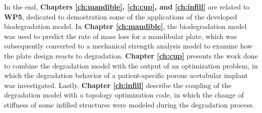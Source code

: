 In the end, \textbf{Chapters \ref{ch:mandible}, \ref{ch:cup}, and \ref{ch:infill}} are related to \textbf{WP5}, dedicated to demostration some of the applications of the developed biodegradation model. In \textbf{Chapter \ref{ch:mandible}}, the biodegradation model was used to predict the rate of mass loss for a mandibular plate, which was subsequently converted to a mechanical strength analysis model to examine how the plate design reacts to degradation. \textbf{Chapter \ref{ch:cup}} presents the work done to combine the degradation model with the output of an optimization problem, in which the degradation behavior of a patient-specific porous acetabular implant was investigated. Lastly, \textbf{Chapter \ref{ch:infill}} describe the coupling of the degradation model with a topology optimization code, in which the change of stiffness of some infilled structures were modeled during the degradation process. 

\cleardoublepage

